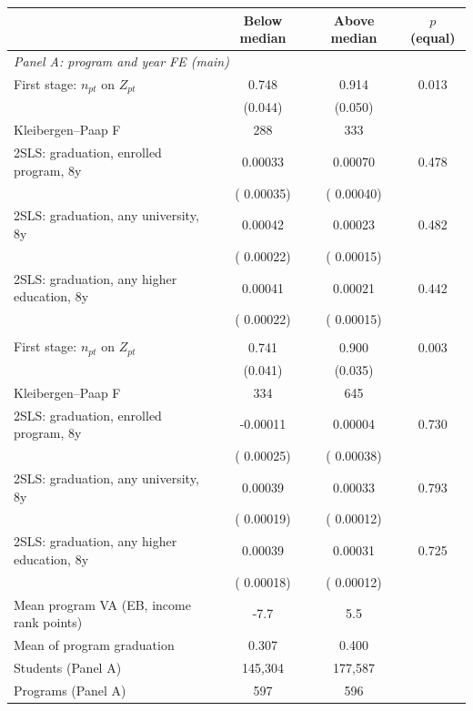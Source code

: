 \begin{tabular}{lccc}
\toprule
 & Below median & Above median & \(p\) (equal) \\
\midrule
\multicolumn{4}{l}{\textit{Panel A: program and year FE (main)}} \\
First stage: \(n_{pt}\) on \(Z_{pt}\) &  0.748\sym{***} &  0.914\sym{***} & 0.013 \\
 & (0.044) & (0.050) & \\
Kleibergen--Paap F &    288 &    333 & \\
2SLS: graduation, enrolled program, 8y &  0.00033 &  0.00070\sym{*} & 0.478 \\
 & ( 0.00035) & ( 0.00040) & \\
2SLS: graduation, any university, 8y &  0.00042\sym{*} &  0.00023 & 0.482 \\
 & ( 0.00022) & ( 0.00015) & \\
2SLS: graduation, any higher education, 8y &  0.00041\sym{*} &  0.00021 & 0.442 \\
 & ( 0.00022) & ( 0.00015) & \\
\addlinespace
\multicolumn{4}{l}{\textit{Panel B: program and university \(\times\) year FE}} \\
First stage: \(n_{pt}\) on \(Z_{pt}\) &  0.741\sym{***} &  0.900\sym{***} & 0.003 \\
 & (0.041) & (0.035) & \\
Kleibergen--Paap F &    334 &    645 & \\
2SLS: graduation, enrolled program, 8y & -0.00011 &  0.00004 & 0.730 \\
 & ( 0.00025) & ( 0.00038) & \\
2SLS: graduation, any university, 8y &  0.00039\sym{**} &  0.00033\sym{***} & 0.793 \\
 & ( 0.00019) & ( 0.00012) & \\
2SLS: graduation, any higher education, 8y &  0.00039\sym{**} &  0.00031\sym{***} & 0.725 \\
 & ( 0.00018) & ( 0.00012) & \\
\midrule
Mean program VA (EB, income rank points) &  -7.7 &   5.5 & \\
Mean of program graduation & 0.307 & 0.400 & \\
Students (Panel A) &   145,304 &   177,587 & \\
Programs (Panel A) &    597 &    596 & \\
\bottomrule
\end{tabular}

